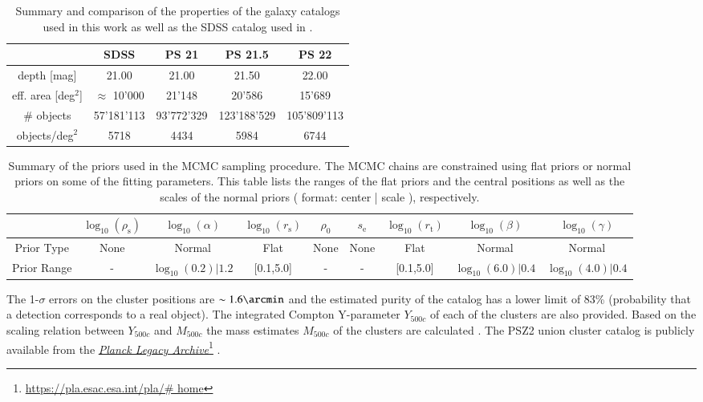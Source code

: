 \documentclass[iop, apjl, twocolappendix, numberedappendix]{emulateapj}
\newcommand\fnurl[2]{%
  \href{#2}{#1}\footnote{\url{#2}}%
}
\begin{document}
\begin{table}
    \centering
    \caption{Summary and comparison of the properties of the galaxy catalogs used in this work as well as the SDSS catalog used in \citet{more2016detection}.}
    \label{tab:galaxy_catalogs}
    \begin{tabular}{ccccc}
    \hline 
    & SDSS & PS 21 & PS 21.5 & PS 22 \\ 
    \hline 
    depth [mag] & 21.00 & 21.00 & 21.50 & 22.00\\ 
    \hline 
    eff. area [deg$^2$] & $\approx$ 10'000 & 21'148 & 20'586 & 15'689\\ 
    \hline 
    \# objects & 57'181'113 & 93'772'329 & 123'188'529 & 105'809'113 \\
    \hline
    objects/deg$^2$ & 5718 & 4434 & 5984 & 6744\\ 
    \hline
    \end{tabular} 
\end{table}
\begin{table}
    \centering
    \caption{Summary of the priors used in the MCMC sampling
procedure. The MCMC chains are constrained using flat priors or
normal priors on some of the fitting parameters. This table lists
the ranges of the flat priors and the central positions as well as
the scales of the normal priors ( format: center | scale ),
respectively.}
    \label{tab:priors}
    \begin{tabular}{ccccccccc}
    \hline 
    & $\log_{10}(\rho_{\mathrm{s}})$ & $\log_{10}(\alpha)$ & $\log_{10}(r_{\mathrm{s}})$ & $\rho_0$ & $s_{\mathrm{e}}$ & $\log_{10}(r_{\mathrm{t}})$ & $\log_{10}(\beta)$ & $\log_{10}(\gamma)$ \\ 
    \hline 
    Prior Type & None & Normal & Flat & None & None & Flat & Normal & Normal\\ 
    \hline 
    Prior Range & - & $\log_{10}(0.2)| 1.2$ & [0.1,5.0] & - & - & [0.1,5.0] & $\log_{10}(6.0) | 0.4$ & $\log_{10}(4.0) | 0.4$ \\
    \hline
    \end{tabular} 
\end{table}

The 1-$\sigma$ errors on the cluster positions are $\sim1.6\arcmin$
and the estimated purity of the catalog has a lower limit of 83\%
(probability that a detection corresponds to a real object). The
integrated Compton Y-parameter $Y_{500c}$ of each of the clusters
are also provided. Based on the scaling relation between $Y_{500c}$
and $M_{500c}$ \citep{ade2014planck} the mass estimates $M_{500c}$
of the clusters are calculated
\citep{adam2016planck,collaboration2016planck}. The PSZ2 union
cluster catalog is publicly available from the \fnurl{\textit{Planck
Legacy Archive}}{https://pla.esac.esa.int/pla/\# home}.
\end{document}
